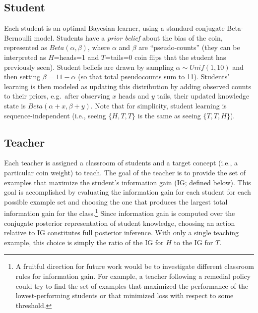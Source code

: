 \documentclass[man]{apa6}
\begin{document}
\subsection{Student}\label{student}

Each student is an optimal Bayesian learner, using a standard conjugate
Beta-Bernoulli model. Students have a \emph{prior belief} about the bias
of the coin, represented as \(Beta(\alpha,\beta)\), where \(\alpha\) and
\(\beta\) are ``pseudo-counts'' (they can be interpreted as
\(H\)=heads=1 and \(T\)=tails=0 coin flips that the student has
previously seen). Student beliefs are drawn by sampling
\(\alpha \sim Unif(1,10)\) and then setting \(\beta = 11 - \alpha\) (so
that total pseudocounts sum to 11). Students' learning is then modeled
as updating this distribution by adding observed counts to their priors,
e.g.~after observing \(x\) heads and \(y\) tails, their updated
knowledge state is \(Beta(\alpha + x, \beta + y)\). Note that for
simplicity, student learning is sequence-independent (i.e., seeing
\(\{H, T, T\}\) is the same as seeing \(\{T, T, H\}\)).

\subsection{Teacher}\label{teacher}

Each teacher is assigned a classroom of students and a target concept
(i.e., a particular coin weight) to teach. The goal of the teacher is to
provide the set of examples that maximize the student's information gain
(IG; defined below). This goal is accomplished by evaluating the
information gain for each student for each possible example set and
choosing the one that produces the largest total information gain for
the class.\footnote{A fruitful direction for future work would be to
  investigate different classroom rules for information gain. For
  example, a teacher following a remedial policy could try to find the
  set of examples that maximized the performance of the
  lowest-performing students or that minimized loss with respect to some
  threshold.} Since information gain is computed over the conjugate
posterior representation of student knowledge, choosing an action
relative to IG constitutes full posterior inference. With only a single
teaching example, this choice is simply the ratio of the IG for \(H\) to
the IG for \(T\).
\end{document}
